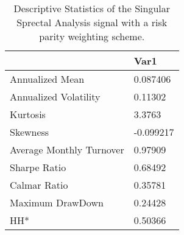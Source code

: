 \begin{table}[H]
\centering
\begin{tabular}{ll}
\hline& Var1 \\ 
\hline 
Annualized Mean & 0.087406 \\ 
Annualized Volatility & 0.11302 \\ 
Kurtosis & 3.3763 \\ 
Skewness & -0.099217 \\ 
Average Monthly Turnover & 0.97909 \\ 
Sharpe Ratio & 0.68492 \\ 
Calmar Ratio & 0.35781 \\ 
Maximum DrawDown & 0.24428 \\ 
HH* & 0.50366 \\ 
\hline
\end{tabular}
\caption{Descriptive Statistics of the Singular Sprectal Analysis signal with a risk parity weighting scheme.}
\label{SSA_RP}
\end{table}